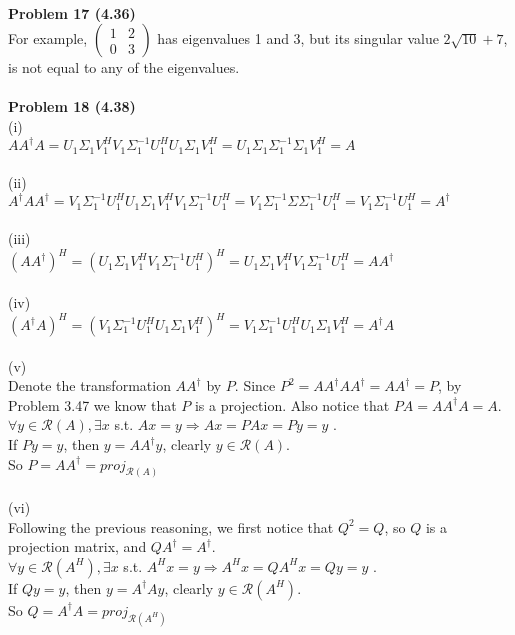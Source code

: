 \documentclass[letterpaper,12pt]{article}
\theoremstyle{definition}
\begin{document}
\\
\noindent\textbf{Problem 17 (4.36)} \\
For example, $\begin{pmatrix}
1 & 2\\
0 & 3
\end{pmatrix}$
has eigenvalues 1 and 3, but its singular value $2\sqrt{10} + 7$, is not equal to any of the eigenvalues.\\
\\
\noindent\textbf{Problem 18 (4.38)} \\
(i)\\
$AA^{\dag}A = U_1\Sigma_1V_1^H V_1\Sigma_1^{-1}U_1^H U_1\Sigma_1V_1^H  =U_1\Sigma_1\Sigma_1^{-1}\Sigma_1V_1^H = A$\\
\\
(ii)\\
$A^{\dag}AA^{\dag} = V_1\Sigma_1^{-1}U_1^H U_1\Sigma_1V_1^H V_1\Sigma_1^{-1}U_1^H = V_1 \Sigma_1^{-1} \Sigma \Sigma_1^{-1} U_1^H = V_1\Sigma_1^{-1}U_1^H = A^{\dag}$\\
\\
(iii)\\
$(AA^{\dag})^H = (U_1\Sigma_1V_1^H V_1\Sigma_1^{-1}U_1^H)^H = U_1\Sigma_1V_1^H V_1\Sigma_1^{-1}U_1^H = AA^{\dag} $\\
\\
(iv)\\
$(A^{\dag}A)^H = (V_1\Sigma_1^{-1}U_1^H U_1\Sigma_1V_1^H)^H = V_1\Sigma_1^{-1}U_1^H U_1\Sigma_1V_1^H = A^{\dag} A$\\
\\
(v)\\
Denote the transformation $AA^{\dag}$ by $P$. Since $P^2 = AA^{\dag} AA^{\dag} =  AA^{\dag} = P$, by Problem 3.47 we know that $P$ is a projection. Also notice that $PA = AA^{\dag}A = A$.\\
$\forall y\in \mathscr{R}(A), \exists x$ s.t. $Ax = y \Rightarrow Ax = PAx = Py = y$ .\\
If $Py = y$, then $y = AA^{\dag} y$, clearly $y\in \mathscr{R}(A)$.\\
So $P = AA^{\dag} = proj_{\mathscr{R}(A)}$\\
\\
(vi)\\
Following the previous reasoning, we first notice that $Q^2 = Q$, so $Q$ is a projection matrix, and $QA^{\dag} = A^{\dag}$.\\
$\forall y\in \mathscr{R}(A^H), \exists x$ s.t. $A^Hx = y \Rightarrow A^Hx = QA^Hx = Qy = y$ .\\
If $Qy = y$, then $y = A^{\dag}A y$, clearly $y\in \mathscr{R}(A^H)$.\\
So $Q = A^{\dag}A = proj_{\mathscr{R}(A^H)}$\\
\end{document}
